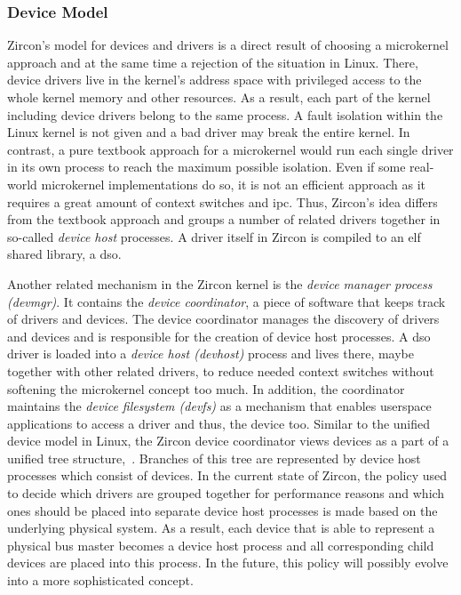 \subsubsection*{Device Model}
Zircon's model for devices and drivers is a direct result of choosing a microkernel approach and at the same time a rejection of the situation in Linux.
There, device drivers live in the kernel's address space with privileged access to the whole kernel memory and other resources.
As a result, each part of the kernel including device drivers belong to the same process.
A fault isolation within the Linux kernel is not given and a bad driver may break the entire kernel. 
In contrast, a pure textbook approach for a microkernel would run each single driver in its own process to reach the maximum possible isolation.
Even if some real-world microkernel implementations do so, it is not an efficient approach as it requires a great amount of context switches and \ac{ipc}\cite{zircon-ddk-gettingstarted}.
Thus, Zircon's idea differs from the textbook approach and groups a number of related drivers together in so-called \textit{device host} processes\cite{zircon-ddk-gettingstarted}.
A driver itself in Zircon is compiled to an \acf{elf} shared library, a \ac{dso}.

Another related mechanism in the Zircon kernel is the \textit{device manager process (devmgr)}.
It contains the \textit{device coordinator}, a piece of software that keeps track of drivers and devices.
The device coordinator manages the discovery of drivers and devices and is responsible for the creation of device host processes.
A \ac{dso} driver is loaded into a \textit{device host (devhost)} process and lives there, maybe together with other related drivers, to reduce needed context switches without softening the microkernel concept too much.
In addition, the coordinator maintains the \textit{device filesystem (devfs)} as a mechanism that enables userspace applications to access a driver and thus, the device too.
Similar to the unified device model in Linux, the Zircon device coordinator views devices as a part of a unified tree structure\cite{zircon-devicemodel},~\cite{zircon-ddk-gettingstarted}.
Branches of this tree are represented by device host processes which consist of devices.
In the current state of Zircon, the policy used to decide which drivers are grouped together for performance reasons and which ones should be placed into separate device host processes is made based on the underlying physical system.
As a result, each device that is able to represent a physical bus master becomes a device host process and all corresponding child devices are placed into this process.
In the future, this policy will possibly evolve into a more sophisticated concept\cite{zircon-devicemodel}.

